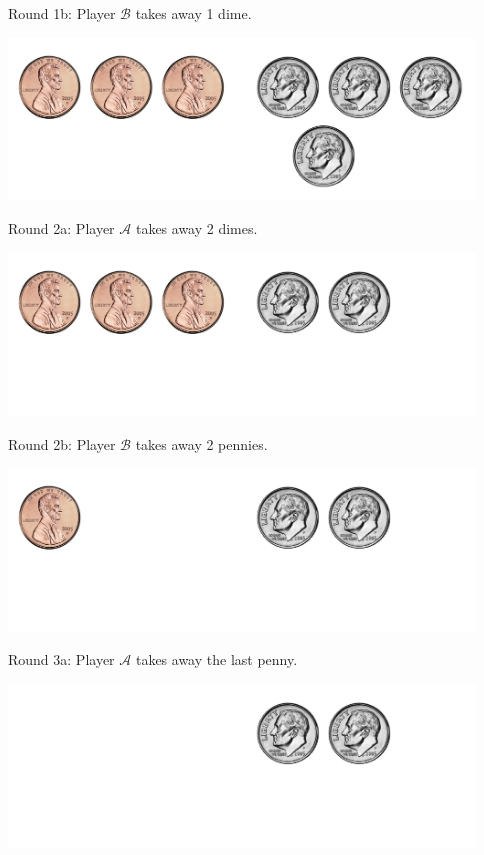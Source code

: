 \documentclass{beamer}
\theoremstyle{theorem}
\theoremstyle{definition}
\newcommand{\<}{\langle}
\renewcommand{\>}{\rangle}
\newcommand{\pl}[1]{\mathscr{#1}}
\begin{document}
\begin{frame}
  Round 1b: Player $\pl B$ takes away 1 dime.

  \centerline{
    \includegraphics[height=1.7in]{nimCoins/34.pdf}
  }
\end{frame}


\begin{frame}
  Round 2a: Player $\pl A$ takes away 2 dimes.

  \centerline{
    \includegraphics[height=1.7in]{nimCoins/32.pdf}
  }
\end{frame}


\begin{frame}
  Round 2b: Player $\pl B$ takes away 2 pennies.

  \centerline{
    \includegraphics[height=1.7in]{nimCoins/12.pdf}
  }
\end{frame}


\begin{frame}
  Round 3a: Player $\pl A$ takes away the last penny.

  \centerline{
    \includegraphics[height=1.7in]{nimCoins/02.pdf}
  }
\end{frame}
\end{document}
